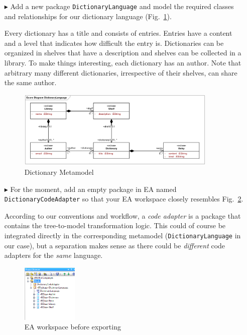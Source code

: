 \begin{enumerate}

\item[$\blacktriangleright$] Add a new package \texttt{DictionaryLanguage} and model the required classes and relationships for our dictionary language (Fig.~\ref{fig:moca-5-DictionaryMM}).

Every dictionary has a title and consists of entries.
Entries have a content and a level that indicates how difficult the entry is.
Dictionaries can be organized in shelves that have a description and shelves can be collected in a library.
To make things interesting, each dictionary has an author.
Note that arbitrary many different dictionaries, irrespective of their shelves, can share the same author.

\begin{figure}[!htbp]
\begin{center}
 \includegraphics[width=0.9\textwidth]{pics/moca/1DictionaryMetaModel/DictionaryLanguage}
  \caption{Dictionary Metamodel}
  \label{fig:moca-5-DictionaryMM}
\end{center}
\end{figure}

\item[$\blacktriangleright$] For the moment, add an empty package in EA named \texttt{Dic\-tion\-ary\-Code\-Adapter} so that your EA workspace closely resembles Fig.~\ref{fig:moca-5-DictionaryMM-ProjectBrowser}.

According to our conventions and workflow, a \emph{code adapter} is a package that contains the tree-to-model transformation logic.
This could of course be integrated directly in the corresponding metamodel (\texttt{Dic\-tion\-ary\-Language} in our case), but a separation makes sense as there could be \emph{different} code adapters for the \emph{same} language.


\begin{figure}[!htbp]
\begin{center}
 \includegraphics[width=0.25\textwidth]{pics/moca/1DictionaryMetaModel/5-DictionaryMM-ProjectBrowser.png}
  \caption{EA workspace before exporting}
  \label{fig:moca-5-DictionaryMM-ProjectBrowser}
\end{center}
\end{figure}


\end{enumerate}

